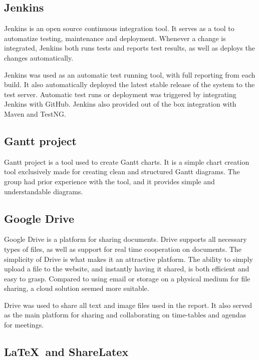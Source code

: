 \subsection{Jenkins}
\label{subsec:prestudies-tools-jenkins}

Jenkins \cite{jenkins} is an open source continuous integration tool. It serves as a tool to automatize testing, maintenance and deployment. Whenever a change is integrated, Jenkins both runs tests and reports test results, as well as deploys the changes automatically.

Jenkins was used as an automatic test running tool, with full reporting from each build. It also automatically deployed the latest stable release of the system to the test server. Automatic test runs or deployment was triggered by integrating Jenkins with GitHub. Jenkins also provided out of the box integration with Maven and TestNG.

\subsection{Gantt project}
\label{subsec:prestudies-tools-gantt_project}

Gantt project \cite{gantt-project} is a tool used to create Gantt charts. It is a simple chart creation tool exclusively made for creating clean and structured Gantt diagrams. The group had prior experience with the tool, and it provides simple and understandable diagrams.

\subsection{Google Drive}
\label{subsec:prestudies-tools-google_drive}

Google Drive \cite{google-drive} is a platform for sharing documents. Drive supports all necessary types of files, as well as support for real time cooperation on documents. The simplicity of Drive is what makes it an attractive platform. The ability to simply upload a file to the website, and instantly having it shared, is both efficient and easy to grasp. Compared to using email or storage on a physical medium for file sharing, a cloud solution seemed more suitable. 

Drive was used to share all text and image files used in the report. It also served as the main platform for sharing and collaborating on time-tables and agendas for meetings.

\subsection{LaTeX\ and ShareLatex}
\label{subsec:prestudies-tools-latex_and_sharelatex}

